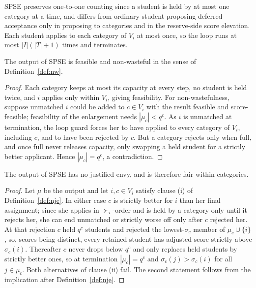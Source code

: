 \documentclass[runningheads]{llncs}
\begin{document}
SPSE preserves one-to-one counting since a student is held by at most one category at a time, and differs from ordinary student-proposing deferred acceptance only in proposing to categories and in the reserve-side score elevation. Each student applies to each category of $V_i$ at most once, so the loop runs at most $|I|(|T|+1)$ times and terminates.

\begin{proposition}
\label{prop:spse-basic}
The output of SPSE is feasible and non-wasteful in the sense of Definition~\ref{def:nw}.
\end{proposition}

\begin{proof}
Each category keeps at most its capacity at every step, no student is held twice, and $i$ applies only within $V_i$, giving feasibility. For non-wastefulness, suppose unmatched $i$ could be added to $c\in V_i$ with the result feasible and score-feasible; feasibility of the enlargement needs $|\mu_c|<q^c$. As $i$ is unmatched at termination, the loop guard forces her to have applied to every category of $V_i$, including $c$, and to have been rejected by $c$. But a category rejects only when full, and once full never releases capacity, only swapping a held student for a strictly better applicant. Hence $|\mu_c|=q^c$, a contradiction.
\end{proof}

\begin{proposition}
\label{prop:spse-nje}
The output of SPSE has no justified envy, and is therefore fair within categories.
\end{proposition}

\begin{proof}
Let $\mu$ be the output and let $i,c\in V_i$ satisfy clause (i) of Definition~\ref{def:nje}. In either case $c$ is strictly better for $i$ than her final assignment; since she applies in $\succ_i$-order and is held by a category only until it rejects her, she can end unmatched or strictly worse off only after $c$ rejected her. At that rejection $c$ held $q^c$ students and rejected the lowest-$\sigma_c$ member of $\mu_c\cup\{i\}$, so, scores being distinct, every retained student has adjusted score strictly above $\sigma_c(i)$. Thereafter $c$ never drops below $q^c$ and only replaces held students by strictly better ones, so at termination $|\mu_c|=q^c$ and $\sigma_c(j)>\sigma_c(i)$ for all $j\in\mu_c$. Both alternatives of clause (ii) fail. The second statement follows from the implication after Definition~\ref{def:nje}.
\end{proof}
\end{document}
